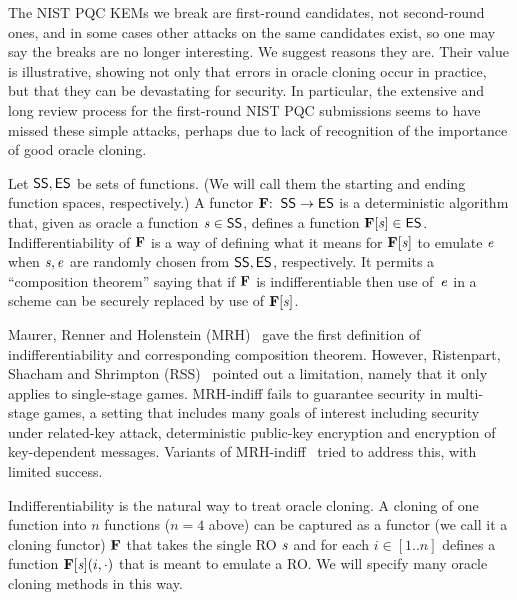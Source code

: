 The NIST PQC KEMs we break are first-round candidates, not second-round ones, and in some cases other attacks on the same candidates exist, so one may say the breaks  are no longer interesting. We suggest reasons they are. Their value is illustrative, showing not only that errors in oracle cloning occur in practice, but that they can be devastating for security. In particular, the extensive and long review process for the first-round NIST PQC submissions seems to have missed these simple attacks, perhaps due to lack of recognition of the importance of good oracle cloning.







Let $\mathsf{SS},\mathsf{ES}$ be sets of functions. (We will call them the starting and ending function spaces, respectively.) A functor $\mathbf{F} \allowbreak {:\;\;} \allowbreak \mathsf{SS} \allowbreak \to \allowbreak\mathsf{ES}$ is a deterministic algorithm that, given as oracle a function $\mathit{s}\in\mathsf{SS}$, defines a function $\mathbf{F}[\mathit{s}] \allowbreak \in \allowbreak \mathsf{ES}$. Indifferentiability of $\mathbf{F}$ is a way of defining what it means for $\mathbf{F}[\mathit{s}]$ to emulate $\mathit{e}$ when $\mathit{s},\mathit{e}$ are randomly chosen from $\mathsf{SS},\mathsf{ES}$, respectively. It permits a ``composition theorem'' saying that if $\mathbf{F}$ is indifferentiable then use of~$\mathit{e}$ in a scheme can be securely replaced by use of $\mathbf{F}[\mathit{s}]$.  

Maurer, Renner and Holenstein (MRH)~\cite{TCC:MauRenHol04} gave the first definition of indifferentiability and corresponding composition theorem. However, Ristenpart, Shacham and Shrimpton (RSS)~\cite{EC:RisShaShr11} pointed out a limitation, namely that it only applies to single-stage games. MRH-indiff fails to guarantee security in multi-stage games, a setting that includes many goals of interest including security under related-key attack, deterministic public-key encryption and encryption of key-dependent messages. Variants of MRH-indiff~\cite{C:CDMP05,EC:RisShaShr11,EC:DGHM13,EC:Mittelbach14} tried to address this, with limited success. 

 Indifferentiability is the natural way to treat oracle cloning. A cloning of one function into $n$ functions ($n=4$ above) can be captured as a functor (we call it a cloning functor) $\mathbf{F}$ that takes the single RO $\mathit{s}$ and for each $i \in [1..n]$ defines a function $\mathbf{F}[\mathit{s}](i,\cdot)$ that is meant to emulate a RO. We will specify many oracle cloning methods in this way.

